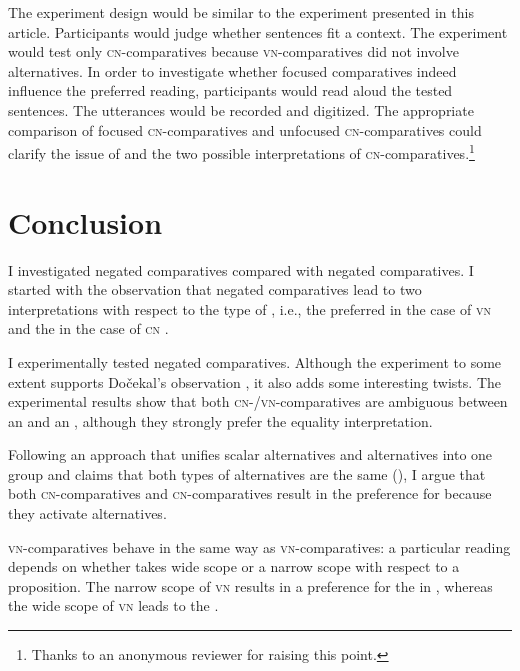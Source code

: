 \documentclass[output=paper, colorlinks, citecolor=brown, newtxmath]{langsci/langscibook}
\begin{document}
The experiment design would be similar to the experiment presented in this article. Participants would judge whether sentences fit a context. The experiment would test only  \textsc{cn-}comparatives because \textsc{vn-}comparatives did not involve  alternatives. In order to investigate whether focused comparatives indeed influence the preferred reading, participants would read aloud the tested sentences. The utterances would be recorded and digitized. The appropriate comparison of focused \textsc{cn-}comparatives and unfocused \textsc{cn-}comparatives could clarify the issue of  and the two possible interpretations of  \textsc{cn-}comparatives.\footnote{Thanks to an anonymous reviewer for raising this point.}


\section{Conclusion}
I investigated  negated comparatives compared with  negated comparatives. I started with the observation that  negated comparatives lead to two interpretations with respect to the type of , i.e., the preferred  in the case of \textsc{vn} and the  in the case of \textsc{cn} \citep{nouwen2008upper}.

I experimentally tested  negated comparatives. Although the experiment to some extent supports Dočekal's observation \citep{dovcekal2017upper}, it also adds some interesting twists. The experimental results show that both  \textsc{cn-/vn-}compa\-ratives are ambiguous between an  and an , although they strongly prefer the equality interpretation.

Following an approach that unifies scalar alternatives and  alternatives into one group and claims that both types of alternatives are the same (\citealt{katzir2007structurally,fox2011characterization,fox2018economy}), I argue that both  \textsc{cn-}com\-par\-a\-tives and  \textsc{cn-}comparatives result in the preference for  because they activate alternatives.

 \textsc{vn-}comparatives behave in the same way as  \textsc{vn-}comparatives: a particular reading depends on whether  takes wide scope or a narrow scope with respect to a proposition. The narrow scope of \textsc{vn} results in a preference for the  in , whereas the wide scope of \textsc{vn} leads to the .
\end{document}
